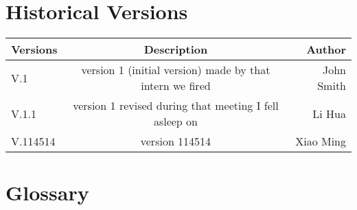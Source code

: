 \documentclass{Atomic}
\begin{document}
\maketitle
\insertCover%
\frontmatter
\let\cleardoublepage=\clearpage%

\chapter{Historical Versions}
\begin{center}
    \begin{tabular}{| l | c | r |}
        \hline
        Versions & Description & Author\\
        \hline
        V.1 & version 1 (initial version) made by that intern we fired & John Smith\\
        V.1.1 & version 1 revised during that meeting I fell asleep on & Li  Hua\\
        V.114514 & version 114514 & Xiao Ming\\
        \hline
    \end{tabular}
\end{center}
\newpage

\chapter{Glossary}
\begin{acronym}[ECU]
\end{acronym}
\newpage
\tableofcontents
\mainmatter



\end{document}
